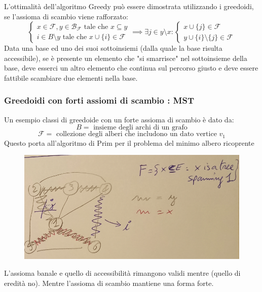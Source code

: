 \documentclass{article}
\begin{document}
    L'ottimalità dell'algoritmo Greedy può essere dimostrata utilizzando i greedoidi,
    se l'assioma di scambio viene rafforzato:
    \[
        \begin{cases}
            x\in\mathcal{F},y\in\mathcal{B}_\mathcal{F}\text{ tale che } x\subseteq y \\
            i\in B\setminus y\text{ tale che } x\cup\{i\}\in\mathcal{F}
        \end{cases}
        \implies
        \exists j\in y\setminus x :
        \begin{cases}
            x\cup\{j\}\in\mathcal{F} \\
            y\cup\{i\}\setminus\{j\}\in\mathcal{F}
        \end{cases}
    \]
    Data una base ed uno dei suoi sottoinsiemi (dalla quale la base risulta
    accessibile), se è presente un elemento che "si smarrisce" nel sottoinsieme della base,
    deve esserci un altro elemento che continua sul percorso giusto e deve essere
    fattibile scambiare due elementi nella base.
    \subsubsection{Greedoidi con forti assiomi di scambio : MST}
    Un esempio classi di greedoide con un forte assioma di scambio è dato da:
    $$B=\text{ insieme degli archi di un grafo}$$
    $$\mathcal{F}=\text{ collezione degli alberi che includono un dato vertice } v_1$$
    Questo porta all'algoritmo di Prim per il problema del minimo albero ricoprente
    \begin{figure}[H]
        \centering
        \includegraphics[scale=0.5]{images/greedoid_mst.png}
    \end{figure}
    L'assioma banale e quello di accessibilità rimangono validi mentre (quello
    di eredità no). Mentre l'assioma di scambio mantiene una forma forte.
\end{document}
